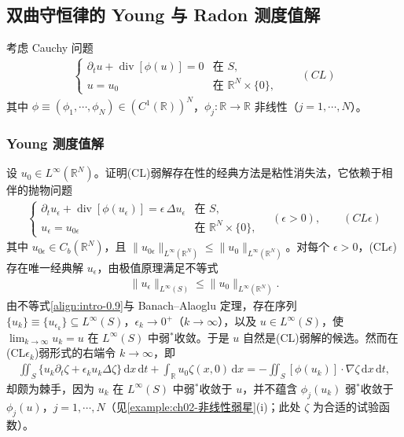 \documentclass[../main.tex]{subfiles}
\begin{document}
\subsection*{双曲守恒律的 Young 与 Radon 测度值解}\label{subsection:intro-hyperbolic}

考虑 Cauchy 问题
\begin{align*}
\begin{cases}
\partial_t u + \operatorname{div}[\phi(u)] = 0 & \text{在 }S,\\
u=u_0 & \text{在 }\mathbb{R}^N\times\{0\},
\end{cases}
\qquad(CL)
\end{align*}
其中 $\phi\equiv(\phi_1,\cdots ,\phi_N)\in(C^1(\mathbb{R}))^N$，$\phi_j:\mathbb{R}\to\mathbb{R}$ 非线性（$j=1,\cdots ,N$）。

\subsubsection*{Young 测度值解}\label{subsubsection:intro-young}

设 $u_0\in L^\infty(\mathbb{R}^N)$。证明(CL)弱解存在性的经典方法是粘性消失法，它依赖于相伴的抛物问题
\begin{align*}
\begin{cases}
\partial_t u_\epsilon + \operatorname{div}[\phi(u_\epsilon)] = \epsilon\,\Delta u_\epsilon & \text{在 }S,\\
u_\epsilon = u_{0\epsilon} & \text{在 }\mathbb{R}^N\times\{0\},
\end{cases}
\quad (\epsilon>0), \qquad(CL\epsilon)
\end{align*}
其中 $u_{0\epsilon}\in C_b(\mathbb{R}^N)$，且 $\|u_{0\epsilon}\|_{L^\infty(\mathbb{R}^N)}\leqslant\|u_0\|_{L^\infty(\mathbb{R}^N)}$。对每个 $\epsilon>0$，(CL$\epsilon$)存在唯一经典解 $u_\epsilon$，由极值原理满足不等式
\begin{align}
\|u_\epsilon\|_{L^\infty(S)} \leqslant \|u_0\|_{L^\infty(\mathbb{R}^N)}. \label{align:intro-0.9}
\end{align}
由不等式\eqref{align:intro-0.9}与 Banach--Alaoglu 定理，存在序列 $\{u_k\}\equiv\{u_{\epsilon_k}\}\subseteq L^\infty(S)$，$\epsilon_k\to0^+$（$k\to\infty$），以及 $u\in L^\infty(S)$，使 $\lim_{k\to\infty}u_k=u$ 在 $L^\infty(S)$ 中弱$^*$收敛。于是 $u$ 自然是(CL)弱解的候选。然而在(CL$\epsilon_k$)弱形式的右端令 $k\to\infty$，即
\begin{align}
\iint_S \{u_k\partial_t\zeta + \epsilon_k u_k\Delta\zeta\}\,\mathrm{d}x\,\mathrm{d}t
+ \int_{\mathbb{R}}u_0\zeta(x,0)\,\mathrm{d}x
= -\iint_S [\phi(u_k)]\cdot\nabla\zeta\,\mathrm{d}x\,\mathrm{d}t, \label{align:intro-0.10}
\end{align}
却颇为棘手，因为 $u_k$ 在 $L^\infty(S)$ 中弱$^*$收敛于 $u$，并不蕴含 $\phi_j(u_k)$ 弱$^*$收敛于 $\phi_j(u)$，$j=1,\cdots ,N$（见\cref{example:ch02-非线性弱星}(i)；此处 $\zeta$ 为合适的试验函数）。
\end{document}
